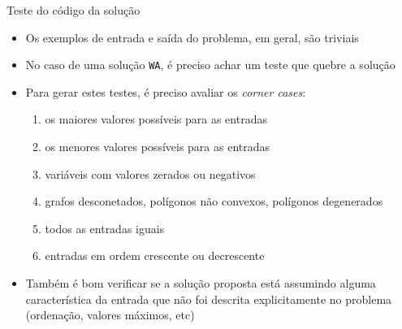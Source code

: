 \begin{frame}[fragile]{Teste do código da solução}

    \begin{itemize}
        \item Os exemplos de entrada e saída do problema, em geral, são triviais

        \item No caso de uma solução \texttt{WA}, é preciso achar um teste que quebre a solução

        \item Para gerar estes testes, é preciso avaliar os \textit{corner cases}:
            \begin{enumerate} 
                \item os maiores valores possíveis para as entradas
                \item os menores valores possíveis para as entradas
                \item variáveis com valores zerados ou negativos
                \item grafos desconetados, polígonos não convexos, polígonos degenerados
                \item todos as entradas iguais
                \item entradas em ordem crescente ou decrescente
            \end{enumerate} 

        \item Também é bom verificar se a solução proposta está assumindo alguma característica
            da entrada que não foi descrita explicitamente no problema (ordenação, valores
            máximos, etc)
    \end{itemize}

\end{frame}
